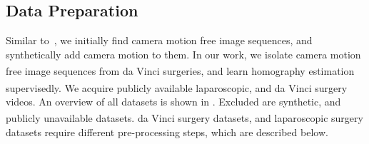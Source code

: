 

\subsection{Data Preparation}

Similar to~\cite{le2020deep}, we initially find camera motion free image sequences, and synthetically add camera motion to them. In our work, we isolate camera motion free image sequences from da Vinci\textsuperscript{\textregistered} surgeries, and learn homography estimation supervisedly. We acquire publicly available laparoscopic, and da Vinci\textsuperscript{\textregistered} surgery videos. An overview of all datasets is shown in . Excluded are synthetic, and publicly unavailable datasets. da Vinci\textsuperscript{\textregistered} surgery datasets, and laparoscopic surgery datasets require different pre-processing steps, which are described below.

